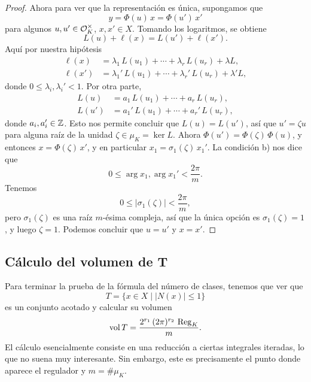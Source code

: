 \begin{proposicion}
\begin{proof}
    Ahora para ver que la representación es única, supongamos que
    $$y = \Phi (u)\,x = \Phi (u')\,x'$$
    para algunos $u,u' \in \mathcal{O}_K^\times$, $x,x' \in X$. Tomando los logaritmos,
    se obtiene
    $$L (u) + \ell (x) = L (u') + \ell (x').$$
    Aquí por nuestra hipótesis
    \begin{align*}
      \ell (x) & = \lambda_1 \, L (u_1) + \cdots + \lambda_r \, L (u_r) + \lambda L, \\
      \ell (x') & = \lambda_1' \, L (u_1) + \cdots + \lambda_r' \, L (u_r) + \lambda' L,
    \end{align*}
    donde $0 \le \lambda_i, \lambda_i' < 1$. Por otra parte,
    \begin{align*}
      L (u) & = a_1 \, L (u_1) + \cdots + a_r \, L (u_r), \\
      L (u') & = a_1' \, L (u_1) + \cdots + a_r' \, L (u_r),
    \end{align*}
    donde $a_i,a_i' \in \mathbb{Z}$. Esto nos permite concluir que $L (u) = L (u')$,
    así que $u' = \zeta u$ para alguna raíz de la unidad
    $\zeta \in \mu_K = \ker L$. Ahora $\Phi (u') = \Phi (\zeta)\,\Phi (u)$,
    y entonces $x = \Phi (\zeta)\,x'$, y en particular $x_1 = \sigma_1
    (\zeta)\,x_1'$.  La condición b) nos dice que
    $$0 \le \arg x_1, \arg x_1' < \frac{2\pi}{m}.$$
    Tenemos
    $$0 \le |\sigma_1 (\zeta)| < \frac{2\pi}{m},$$
    pero $\sigma_1 (\zeta)$ es una raíz $m$-ésima compleja, así que la única
    opción es $\sigma_1 (\zeta) = 1$, y luego $\zeta = 1$. Podemos concluir que
    $u = u'$ y $x = x'$.
  \end{proof}
\end{proposicion}


\subsection{Cálculo del volumen de T}
\label{sec:vol-T}

Para terminar la prueba de la fórmula del número de clases, tenemos que ver que
$$T = \{ x \in X \mid |N (x)| \le 1 \}$$
es un conjunto acotado y calcular su volumen
$$\operatorname{vol} T = \frac{2^{r_1}\,(2\pi)^{r_2}\,\operatorname{Reg}_K}{m}.$$
El cálculo esencialmente consiste en una reducción a ciertas integrales
iteradas, lo que no suena muy interesante. Sin embargo, este es precisamente
el punto donde aparece el regulador y $m = \# \mu_K$.

